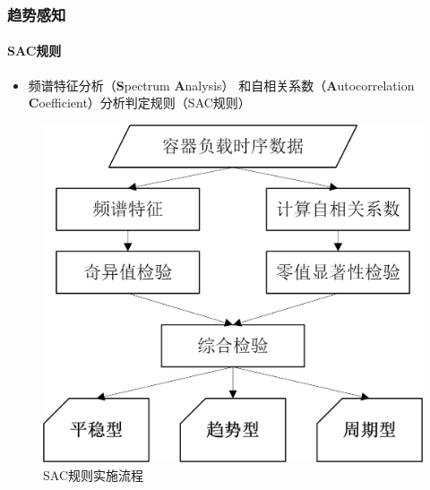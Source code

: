 \begin{frame}
\frametitle{趋势感知}
\framesubtitle{SAC规则}
\begin{itemize}
    \item 频谱特征分析（\textbf{S}pectrum \textbf{A}nalysis）
    和自相关系数（\textbf{A}utocorrelation \textbf{C}oefficient）分析判定规则（SAC规则）
\end{itemize}
\begin{figure}[htb]
\centering
\includegraphics[scale=0.6]{figures/fig8_sac_process.jpg}
\caption{SAC规则实施流程}
\label{fig:fig8}
\end{figure}
\end{frame}

